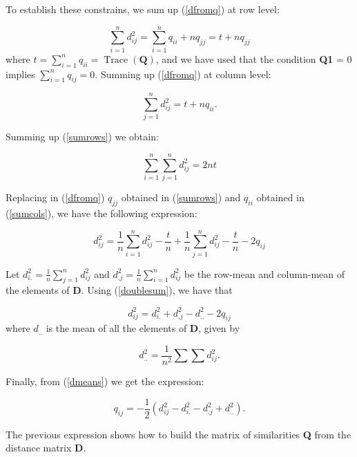 \documentclass[11pt]{report}
\DeclareMathOperator{\Tr}{Trace}
\begin{document}
\indent To establish these constrains, we sum up (\ref{dfromq}) at row level:

\begin{equation} \label{sumrows}
\sum_{i = 1}^n d_{ij}^2 = \sum_{i = 1}^n q_{ii} + nq_{jj} = t + nq_{jj}
\end{equation}
where $t = \sum_{i = 1}^n q_{ii} = \Tr(\mathbf{Q})$, and we have used that the
condition \textbf{Q}\textbf{1} = 0 implies $\sum_{i = 1}^n q_{ij} = 0$. Summing 
up (\ref{dfromq}) at column level:

\begin{equation} \label{sumcols}
\sum_{j = 1}^n d_{ij}^2 = t + nq_{ii}.
\end{equation}

\indent Summing up (\ref{sumrows}) we obtain:

\begin{equation} \label{doublesum}
\sum_{i = 1}^n\sum_{j = 1}^n d_{ij}^2 = 2nt
\end{equation}

\indent Replacing in (\ref{dfromq}) $q_{jj}$ obtained in (\ref{sumrows}) and $q_{ii}$
obtained in (\ref{sumcols}), we have the following expression:

\begin{equation} \label{generaldij}
d_{ij}^2 = \frac{1}{n}\sum_{i = 1}^n d_{ij}^2 - \frac{t}{n} + \frac{1}{n} \sum_{j = 1}^n d_{ij}^2 -\frac{t}{n} -2q_{ij}
\end{equation}

\indent Let $d_{i.}^2 = \frac{1}{n}\sum_{j = 1}^n d_{ij}^2$ and $d_{.j}^2 = \frac{1}{n}\sum_{i=1}^n d_{ij}^2$ 
be the row-mean and column-mean of the elements of \textbf{D}. Using 
(\ref{doublesum}), we have that

\begin{equation} \label{dmeans}
d_{ij}^2 = d_{i.}^2 + d_{.j}^2 - d_{..}^2-2q_{ij}
\end{equation}
where $d_{..}$ is the mean of all the elements of \textbf{D}, given by

\[
d_{..}^2 = \frac{1}{n^2}\sum \sum d_{ij}^2.
\]

\indent Finally, from (\ref{dmeans}) we get the expression:

\begin{equation} \label{qij2}
q_{ij} = -\frac{1}{2}(d_{ij}^2 - d_{i.}^2 - d_{.j}^2 + d_{..}^2).
\end{equation}

\indent The previous expression shows how to build the matrix of similarities 
\textbf{Q} from the distance matrix \textbf{D}.
\end{document}
